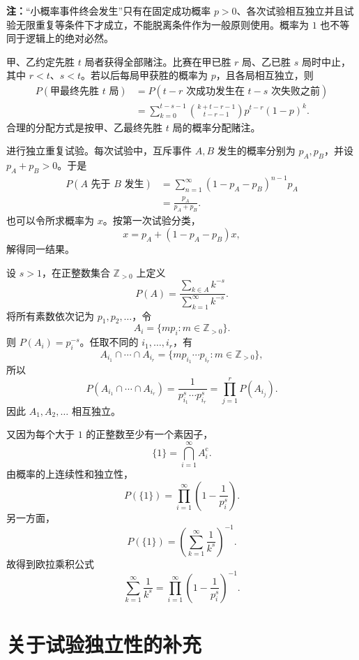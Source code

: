 \textbf{注：}\quad “小概率事件终会发生”只有在固定成功概率 $p>0$、各次试验相互独立并且试验无限重复等条件下才成立，不能脱离条件作为一般原则使用。概率为 $1$ 也不等同于逻辑上的绝对必然。

\begin{example}[分赌注问题]
甲、乙约定先胜 $t$ 局者获得全部赌注。比赛在甲已胜 $r$ 局、乙已胜 $s$ 局时中止，其中 $r<t$、$s<t$。若以后每局甲获胜的概率为 $p$，且各局相互独立，则
\[
\begin{aligned}
P(\text{甲最终先胜 }t\text{ 局})
&=P(t-r\text{ 次成功发生在 }t-s\text{ 次失败之前})\\
&=\sum_{k=0}^{t-s-1}
\binom{k+t-r-1}{t-r-1}p^{t-r}(1-p)^k.
\end{aligned}
\]
合理的分配方式是按甲、乙最终先胜 $t$ 局的概率分配赌注。
\end{example}

\begin{example}[事件 $A$ 先于事件 $B$ 发生]
进行独立重复试验。每次试验中，互斥事件 $A,B$ 发生的概率分别为 $p_A,p_B$，并设 $p_A+p_B>0$。于是
\[
\begin{aligned}
P(A\text{ 先于 }B\text{ 发生})
&=\sum_{n=1}^{\infty}(1-p_A-p_B)^{n-1}p_A\\
&=\frac{p_A}{p_A+p_B}.
\end{aligned}
\]
也可以令所求概率为 $x$。按第一次试验分类，
\[
x=p_A+(1-p_A-p_B)x,
\]
解得同一结果。
\end{example}

\begin{example}[由独立性得到欧拉乘积公式]
设 $s>1$，在正整数集合 $\mathbb Z_{>0}$ 上定义
\[
P(A)=\frac{\displaystyle\sum_{k\in A}k^{-s}}
{\displaystyle\sum_{k=1}^{\infty}k^{-s}}.
\]
将所有素数依次记为 $p_1,p_2,\ldots$，令
\[
A_i=\{mp_i:m\in\mathbb Z_{>0}\}.
\]
则 $P(A_i)=p_i^{-s}$。任取不同的 $i_1,\ldots,i_r$，有
\[
A_{i_1}\cap\cdots\cap A_{i_r}
=\{mp_{i_1}\cdots p_{i_r}:m\in\mathbb Z_{>0}\},
\]
所以
\[
P(A_{i_1}\cap\cdots\cap A_{i_r})
=\frac1{p_{i_1}^s\cdots p_{i_r}^s}
=\prod_{j=1}^{r}P(A_{i_j}).
\]
因此 $A_1,A_2,\ldots$ 相互独立。

又因为每个大于 $1$ 的正整数至少有一个素因子，
\[
\{1\}=\bigcap_{i=1}^{\infty}A_i^{\mathrm c}.
\]
由概率的上连续性和独立性，
\[
P(\{1\})
=\prod_{i=1}^{\infty}\left(1-\frac1{p_i^s}\right).
\]
另一方面，
\[
P(\{1\})=\left(\sum_{k=1}^{\infty}\frac1{k^s}\right)^{-1}.
\]
故得到欧拉乘积公式
\[
\sum_{k=1}^{\infty}\frac1{k^s}
=\prod_{i=1}^{\infty}\left(1-\frac1{p_i^s}\right)^{-1}.
\]
\end{example}
\newpage
\section{关于试验独立性的补充}

